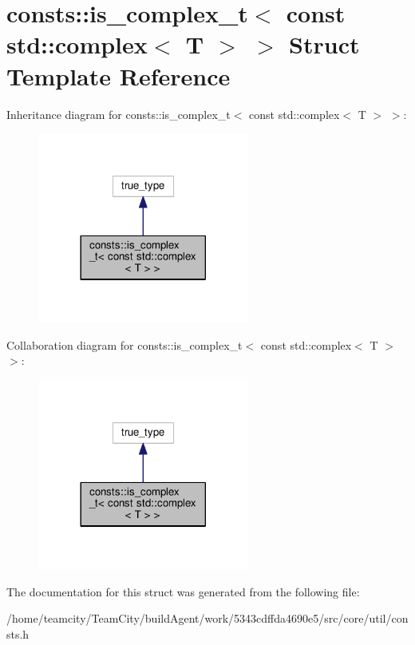 \hypertarget{structconsts_1_1is__complex__t_3_01const_01std_1_1complex_3_01T_01_4_01_4}{}\section{consts\+:\+:is\+\_\+complex\+\_\+t$<$ const std\+:\+:complex$<$ T $>$ $>$ Struct Template Reference}
\label{structconsts_1_1is__complex__t_3_01const_01std_1_1complex_3_01T_01_4_01_4}


Inheritance diagram for consts\+:\+:is\+\_\+complex\+\_\+t$<$ const std\+:\+:complex$<$ T $>$ $>$\+:
\nopagebreak
\begin{figure}[H]
\begin{center}
\leavevmode
\includegraphics[width=197pt]{structconsts_1_1is__complex__t_3_01const_01std_1_1complex_3_01T_01_4_01_4__inherit__graph}
\end{center}
\end{figure}


Collaboration diagram for consts\+:\+:is\+\_\+complex\+\_\+t$<$ const std\+:\+:complex$<$ T $>$ $>$\+:
\nopagebreak
\begin{figure}[H]
\begin{center}
\leavevmode
\includegraphics[width=197pt]{structconsts_1_1is__complex__t_3_01const_01std_1_1complex_3_01T_01_4_01_4__coll__graph}
\end{center}
\end{figure}


The documentation for this struct was generated from the following file\+:\begin{DoxyCompactItemize}
\item 
/home/teamcity/\+Team\+City/build\+Agent/work/5343cdffda4690e5/src/core/util/consts.\+h\end{DoxyCompactItemize}
